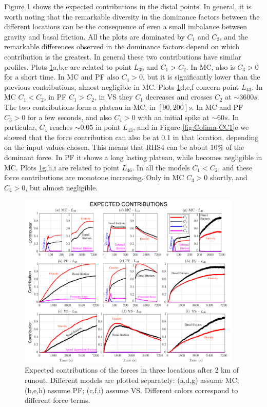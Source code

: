 \documentclass{article}
\begin{document}
Figure \ref{fig:Colima-Ci_2} shows the expected contributions in the distal points. In general, it is worth noting that the remarkable diversity in the dominance factors between the different locations can be the consequence of even a small imbalance between gravity and basal friction. All the plots are dominated by $C_1$ and $C_2$, and the remarkable differences observed in the dominance factors depend on which contribution is the greatest. In general these two contributions have similar profiles. Plots \ref{fig:Colima-Ci_2}a,b,c are related to point $L_{39}$ and $C_1>C_2$. In MC, also is $C_3>0$ for a short time. In MC and PF also $C_4>0$, but it is significantly lower than the previous contributions, almost negligible in MC. Plots \ref{fig:Colima-Ci_2}d,e,f concern point $L_{43}$. In MC $C_1<C_2$, in PF $C_1>C_2$, in VS they $C_1$ decreases and crosses $C_2$ at $\sim 3600 s$. The two contributions form a plateau in MC, in $[90, 200] s$. In MC and PF $C_3>0$ for a few seconds, and also $C_4>0$ with an initial spike at $\sim 60s$. In particular, $C_4$ reaches $\sim 0.05$ in point $L_{43}$, and in Figure \ref{fig:Colima-CC1}e we showed that the force contribution can also be at 0.1 in that location, depending on the input values chosen. This means that RHS4 can be about 10\% of the dominant force. In PF it shows a long lasting plateau, while becomes negligible in MC. Plots \ref{fig:Colima-Ci_2}g,h,i are related to point $L_{46}$. In all the models $C_1<C_2$, and these force contributions are monotone increasing. Only in MC $C_3>0$ shortly, and $C_4>0$, but almost negligible.
\begin{figure}[H]
         \centering
        \includegraphics[width=0.95\textwidth]{Ci2_total.png}
        \caption{Expected contributions of the forces in three locations after 2 km of runout. Different models are plotted separately: (a,d,g) assume MC; (b,e,h) assume PF; (c,f,i) assume VS. Different colors correspond to different force terms.}
        \label{fig:Colima-Ci_2}
\end{figure}
\end{document}
